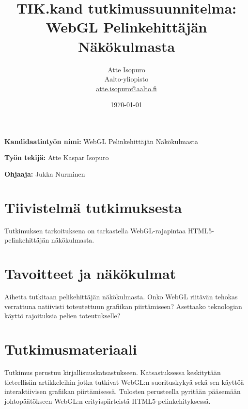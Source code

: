 \documentclass[12pt,a4paper,finnish,oneside]{article}
\begin{document}

\title{TIK.kand tutkimussuunnitelma:\\[5mm]
WebGL Pelinkehittäjän Näkökulmasta}

\author{Atte Isopuro\\
Aalto-yliopisto\\
\url{atte.isopuro@aalto.fi}}

\date{\today}

\maketitle


%

\textbf{Kandidaatintyön nimi:} WebGL Pelinkehittäjän Näkökulmasta

\textbf{Työn tekijä:} Atte Kaspar Isopuro

\textbf{Ohjaaja:} Jukka Nurminen


\section{Tiivistelmä tutkimuksesta}

Tutkimuksen tarkoituksena on tarkastella WebGL-rajapintaa HTML5-pelinkehittäjän näkökulmasta.

\section{Tavoitteet ja näkökulmat}

Aihetta tutkitaan pelikehittäjän näkökulmasta. Onko WebGL riitävän tehokas verrattuna natiivisti toteutettuun grafiikan piirtämiseen? Asettaako teknologian käyttö rajoituksia pelien toteutukselle?

\section{Tutkimusmateriaali}

Tutkimus perustuu kirjallisuuskatsastukseen. Katsastuksessa keskitytään tieteellisiin artikkeleihin jotka tutkivat WebGL:n suorituskykyä sekä sen käyttöä interaktiivisen grafiikan piirtämisessä. Tulosten perusteella pyritään pääsemään johtopäätökseen WebGL:n erityispiirteistä HTML5-pelinkehityksessä.
\end{document}
